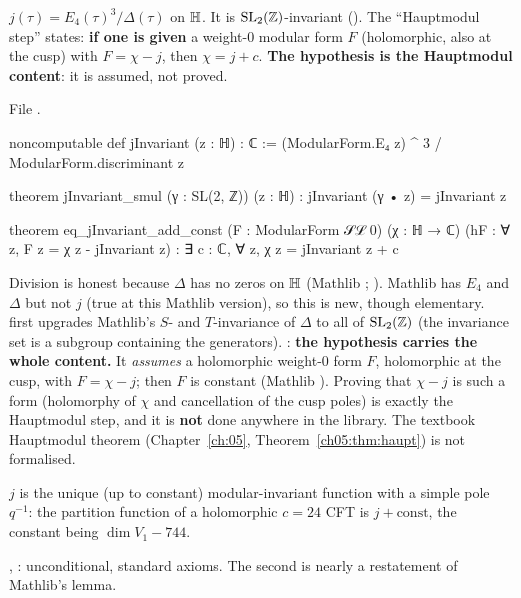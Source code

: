 \begin{definition}[Analytic $j$]\label{l14:def:jinv}
$j(\tau) = E_4(\tau)^3/\Delta(\tau)$ on $\mathbb{H}$. It is $\mathrm{SL}_2(\mathbb{Z})$-invariant (). The ``Hauptmodul
step''  states: \textbf{if one is given} a weight-$0$ modular form $F$ (holomorphic, also at the cusp)
with $F = \chi - j$, then $\chi = j + c$. \textbf{The hypothesis is the Hauptmodul content}: it is assumed, not proved.
\end{definition}
\noindent File .
\begin{leancode}
noncomputable def jInvariant (z : ℍ) : ℂ :=
  (ModularForm.E₄ z) ^ 3 / ModularForm.discriminant z

theorem jInvariant_smul (γ : SL(2, ℤ)) (z : ℍ) : jInvariant (γ • z) = jInvariant z

theorem eq_jInvariant_add_const (F : ModularForm 𝒮ℒ 0) (χ : ℍ → ℂ)
    (hF : ∀ z, F z = χ z - jInvariant z) : ∃ c : ℂ, ∀ z, χ z = jInvariant z + c
\end{leancode}
\begin{dictionary}
Division is honest because $\Delta$ has no zeros on $\mathbb{H}$ (Mathlib ; ).
Mathlib has $E_4$ and $\Delta$ but not $j$ (true at this Mathlib version), so this is new, though elementary.
 first upgrades Mathlib's $S$- and $T$-invariance of $\Delta$ to all of $\mathrm{SL}_2(\mathbb{Z})$ (the invariance
set is a subgroup containing the generators). : \textbf{the hypothesis carries the whole
content.} It \emph{assumes} a holomorphic weight-$0$ form $F$, holomorphic at the cusp, with $F = \chi - j$; then $F$ is
constant (Mathlib ). Proving that $\chi - j$ is such a form (holomorphy of $\chi$ and
cancellation of the cusp poles) is exactly the Hauptmodul step, and it is \textbf{not} done anywhere in the library. The
textbook Hauptmodul theorem (Chapter~\ref{ch:05}, Theorem~\ref{ch05:thm:haupt}) is not formalised.
\end{dictionary}
\begin{physics}
$j$ is the unique (up to constant) modular-invariant function with a simple pole $q^{-1}$: the partition function of a
holomorphic $c=24$ CFT is $j + \text{const}$, the constant being $\dim V_1 - 744$.
\end{physics}
\begin{status}
, : unconditional, standard axioms. The second is nearly a restatement of
Mathlib's lemma.
\end{status}

